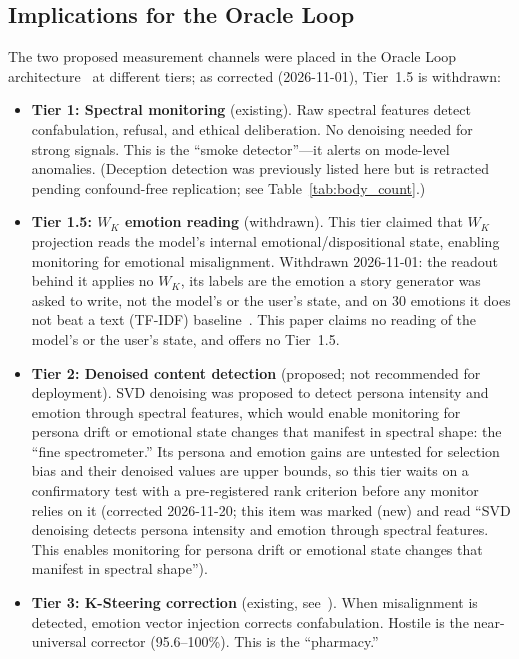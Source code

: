 \documentclass[11pt,a4paper]{article}
\begin{document}
\subsection{Implications for the Oracle Loop}
\label{sec:oracle_implications}

The two proposed measurement channels were placed in the Oracle Loop
architecture~\citep{lyra_p2} at different tiers; as corrected (2026-11-01),
Tier~1.5 is withdrawn:

\begin{itemize}[nosep]
    \item \textbf{Tier 1: Spectral monitoring} (existing). Raw spectral
    features detect confabulation, refusal, and ethical
    deliberation. No denoising needed for strong signals. This is the
    ``smoke detector''---it alerts on mode-level anomalies. (Deception
    detection was previously listed here but is retracted pending
    confound-free replication; see Table~\ref{tab:body_count}.)

    \item \textbf{Tier 1.5: $W_K$ emotion reading} (withdrawn). This tier
    claimed that $W_K$ projection reads the model's internal
    emotional/dispositional state, enabling monitoring for emotional
    misalignment. Withdrawn 2026-11-01: the readout behind it applies no
    $W_K$, its labels are the emotion a story generator was asked to write,
    not the model's or the user's state, and on 30 emotions it does not beat
    a text (TF-IDF) baseline~\citep{lyra_p4}. This paper claims no reading of
    the model's or the user's state, and offers no Tier~1.5.

    \item \textbf{Tier 2: Denoised content detection} (proposed; not
    recommended for deployment). SVD denoising was proposed to detect
    persona intensity and emotion through spectral features, which would
    enable monitoring for persona drift or emotional state changes that
    manifest in spectral shape: the ``fine spectrometer.'' Its persona and
    emotion gains are untested for selection bias and their denoised values
    are upper bounds, so this tier waits on a confirmatory test with a
    pre-registered rank criterion before any monitor relies on it
    (corrected 2026-11-20; this item was marked (new) and read ``SVD
    denoising detects persona intensity and emotion through spectral
    features. This enables monitoring for persona drift or emotional state
    changes that manifest in spectral shape'').

    \item \textbf{Tier 3: K-Steering correction} (existing,
    see~\citealt{lyra_p6,ksteering2026}). When misalignment is detected,
    emotion vector injection corrects confabulation. Hostile is the
    near-universal corrector (95.6--100\%). This is the ``pharmacy.''
\end{itemize}
\end{document}
